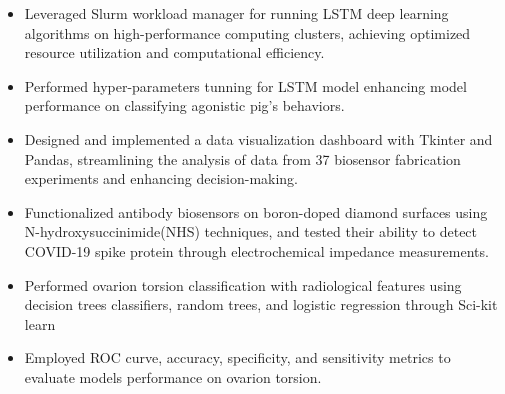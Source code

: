 \documentclass[12pt,a4paper,sans]{moderncv} %
\begin{document}
{
    \begin{itemize}
        \item Leveraged Slurm workload manager for running LSTM deep learning algorithms on high-performance computing clusters, achieving optimized resource utilization and computational efficiency. 
        \item Performed hyper-parameters tunning for LSTM model enhancing model performance on classifying agonistic pig's behaviors.
    \end{itemize}
}

{
    \begin{itemize}
        \item Designed and implemented a data visualization dashboard with Tkinter and Pandas, streamlining the analysis of data from 37 biosensor fabrication experiments and enhancing decision-making.
        \item Functionalized antibody biosensors on boron-doped diamond surfaces using N-hydroxysuccinimide(NHS) techniques, and tested their ability to detect COVID-19 spike protein through electrochemical impedance measurements.
    \end{itemize}
}

{
    \begin{itemize}
        \item Performed ovarion torsion classification with radiological features using decision trees classifiers, random trees, and logistic regression through Sci-kit learn
        \item Employed ROC curve, accuracy, specificity, and sensitivity metrics to evaluate models performance on ovarion torsion.
    \end{itemize}
}
\end{document}
